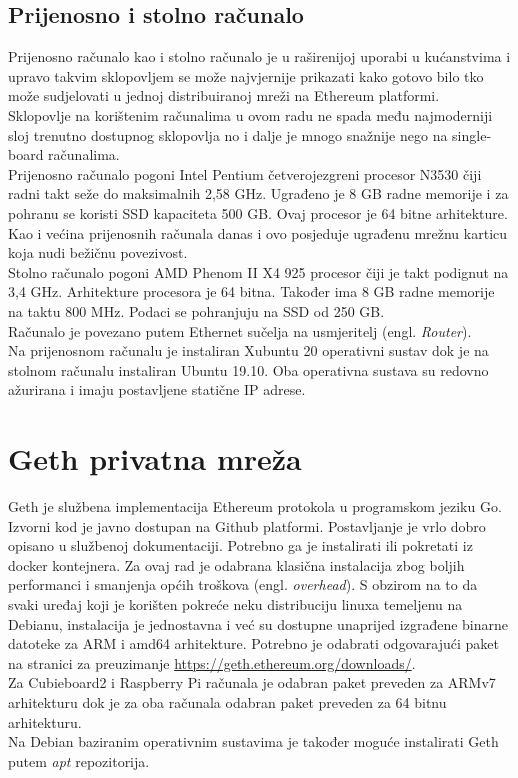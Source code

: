 \documentclass[times, utf8, zavrsni, numeric]{fer}
\begin{document}
\subsection{Prijenosno i stolno računalo}
Prijenosno računalo kao i stolno računalo je u raširenijoj uporabi u kućanstvima i upravo takvim sklopovljem se može
najvjernije prikazati kako gotovo bilo tko može sudjelovati u jednoj distribuiranoj mreži na Ethereum platformi. \\
Sklopovlje na korištenim računalima u ovom radu ne spada među najmoderniji sloj trenutno dostupnog sklopovlja no i dalje
je mnogo snažnije nego na single-board računalima. \\
Prijenosno računalo pogoni Intel Pentium četverojezgreni procesor N3530 čiji radni takt seže do maksimalnih 2,58 GHz.
Ugrađeno je 8 GB radne memorije i za pohranu se koristi SSD kapaciteta 500 GB. Ovaj procesor je 64 bitne arhitekture.
Kao i većina prijenosnih računala danas i ovo posjeduje ugrađenu mrežnu karticu koja nudi bežičnu povezivost. \\
Stolno računalo pogoni AMD Phenom II X4 925 procesor čiji je takt podignut na 3,4 GHz. Arhitekture procesora je 64 bitna.
Također ima 8 GB radne memorije na taktu 800 MHz. Podaci se pohranjuju na SSD od 250 GB. \\
Računalo je povezano putem Ethernet sučelja na usmjeritelj (engl. \emph{Router}). \\
Na prijenosnom računalu je instaliran Xubuntu 20 operativni sustav dok je na stolnom računalu instaliran Ubuntu 19.10.
Oba operativna sustava su redovno ažurirana i imaju postavljene statične IP adrese.
\section{Geth privatna mreža}
Geth je službena implementacija Ethereum protokola u programskom jeziku Go. Izvorni kod je javno dostupan na Github platformi. 
Postavljanje je vrlo dobro opisano u službenoj dokumentaciji. Potrebno ga je instalirati ili pokretati iz docker kontejnera. 
Za ovaj rad je odabrana klasična instalacija zbog boljih performanci i smanjenja općih troškova (engl. \emph{overhead}).
S obzirom na to da svaki uređaj koji je korišten pokreće neku distribuciju linuxa temeljenu na Debianu, instalacija je jednostavna
i već su dostupne unaprijed izgrađene binarne datoteke za ARM i amd64 arhitekture. Potrebno je odabrati odgovarajući paket na
stranici za preuzimanje \url{https://geth.ethereum.org/downloads/}.\\ Za Cubieboard2 i Raspberry Pi računala je odabran paket
preveden za ARMv7 arhitekturu dok je za oba računala odabran paket preveden za 64 bitnu arhitekturu. \\
Na Debian baziranim operativnim sustavima je također moguće instalirati Geth putem \emph{apt} repozitorija. \\
\end{document}
